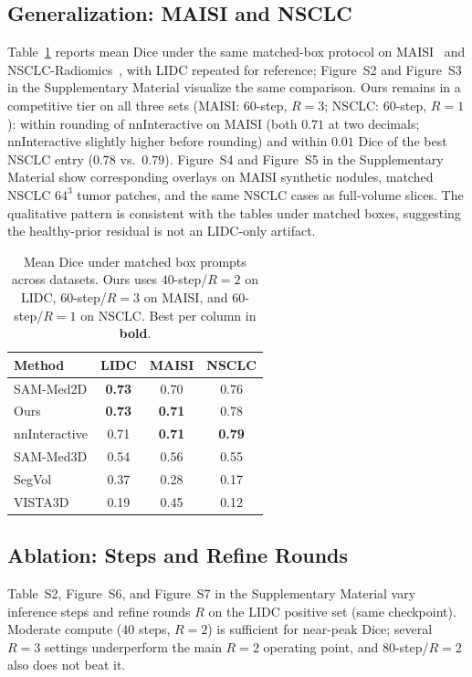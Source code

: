 \documentclass[letterpaper]{article} %
\newcommand{\suppFigBench}{Figure~S2}
\newcommand{\suppFigBenchPer}{Figure~S3}
\newcommand{\suppFigQualCross}{Figure~S4}
\newcommand{\suppFigQualNSCLC}{Figure~S5}
\newcommand{\suppTabAblation}{Table~S2}
\newcommand{\suppFigAblation}{Figure~S6}
\newcommand{\suppFigQualAblation}{Figure~S7}
\begin{document}
\subsection{Generalization: MAISI and NSCLC}
Table~\ref{tab:cross} reports mean Dice under the same matched-box
protocol on MAISI~\citep{maisi2025} and
NSCLC-Radiomics~\citep{aerts2014nsclc}, with LIDC repeated for
reference; \suppFigBench{} and \suppFigBenchPer{} in the Supplementary
Material visualize the same comparison.
Ours remains in a competitive tier on all three sets
(MAISI: \(60\)-step, \(R{=}3\); NSCLC: \(60\)-step, \(R{=}1\)): within
rounding of nnInteractive on MAISI (both \(0.71\) at two decimals;
nnInteractive slightly higher before rounding) and within \(0.01\) Dice
of the best NSCLC entry (\(0.78\) vs.\ \(0.79\)).
\suppFigQualCross{} and \suppFigQualNSCLC{} in the Supplementary Material
show corresponding overlays on MAISI synthetic nodules, matched NSCLC
\(64^3\) tumor patches, and the same NSCLC cases as full-volume slices.
The qualitative pattern is consistent with the tables under matched
boxes, suggesting the healthy-prior residual is not an LIDC-only
artifact.

\begin{table}[t]
\centering
\caption{Mean Dice under matched box prompts across datasets.
Ours uses \(40\)-step/\(R{=}2\) on LIDC, \(60\)-step/\(R{=}3\) on
MAISI, and \(60\)-step/\(R{=}1\) on NSCLC. Best per column in
\textbf{bold}.}
\label{tab:cross}
\begin{tabular}{lccc}
\toprule
Method & LIDC & MAISI & NSCLC \\
\midrule
SAM-Med2D     & \textbf{0.73} & 0.70 & 0.76 \\
Ours          & \textbf{0.73} & \textbf{0.71} & 0.78 \\
nnInteractive & 0.71 & \textbf{0.71} & \textbf{0.79} \\
SAM-Med3D     & 0.54 & 0.56 & 0.55 \\
SegVol        & 0.37 & 0.28 & 0.17 \\
VISTA3D       & 0.19 & 0.45 & 0.12 \\
\bottomrule
\end{tabular}
\end{table}

\subsection{Ablation: Steps and Refine Rounds}
\suppTabAblation{}, \suppFigAblation{}, and \suppFigQualAblation{} in
the Supplementary Material vary inference steps and refine rounds \(R\)
on the LIDC positive set (same checkpoint). Moderate compute
(\(40\) steps, \(R{=}2\)) is sufficient for near-peak Dice; several
\(R{=}3\) settings underperform the main \(R{=}2\) operating point, and
\(80\)-step/\(R{=}2\) also does not beat it.
\end{document}
